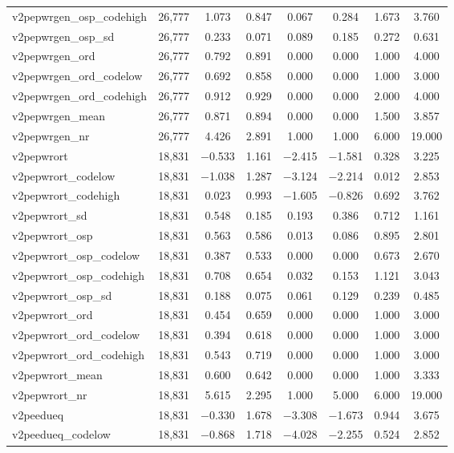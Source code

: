 \begin{table}[!htbp]
\begin{tabular}{@{\extracolsep{5pt}}lccccccc}
v2pepwrgen\_osp\_codehigh & 26,777 & 1.073 & 0.847 & 0.067 & 0.284 & 1.673 & 3.760 \\ 
v2pepwrgen\_osp\_sd & 26,777 & 0.233 & 0.071 & 0.089 & 0.185 & 0.272 & 0.631 \\ 
v2pepwrgen\_ord & 26,777 & 0.792 & 0.891 & 0.000 & 0.000 & 1.000 & 4.000 \\ 
v2pepwrgen\_ord\_codelow & 26,777 & 0.692 & 0.858 & 0.000 & 0.000 & 1.000 & 3.000 \\ 
v2pepwrgen\_ord\_codehigh & 26,777 & 0.912 & 0.929 & 0.000 & 0.000 & 2.000 & 4.000 \\ 
v2pepwrgen\_mean & 26,777 & 0.871 & 0.894 & 0.000 & 0.000 & 1.500 & 3.857 \\ 
v2pepwrgen\_nr & 26,777 & 4.426 & 2.891 & 1.000 & 1.000 & 6.000 & 19.000 \\ 
v2pepwrort & 18,831 & $-$0.533 & 1.161 & $-$2.415 & $-$1.581 & 0.328 & 3.225 \\ 
v2pepwrort\_codelow & 18,831 & $-$1.038 & 1.287 & $-$3.124 & $-$2.214 & 0.012 & 2.853 \\ 
v2pepwrort\_codehigh & 18,831 & 0.023 & 0.993 & $-$1.605 & $-$0.826 & 0.692 & 3.762 \\ 
v2pepwrort\_sd & 18,831 & 0.548 & 0.185 & 0.193 & 0.386 & 0.712 & 1.161 \\ 
v2pepwrort\_osp & 18,831 & 0.563 & 0.586 & 0.013 & 0.086 & 0.895 & 2.801 \\ 
v2pepwrort\_osp\_codelow & 18,831 & 0.387 & 0.533 & 0.000 & 0.000 & 0.673 & 2.670 \\ 
v2pepwrort\_osp\_codehigh & 18,831 & 0.708 & 0.654 & 0.032 & 0.153 & 1.121 & 3.043 \\ 
v2pepwrort\_osp\_sd & 18,831 & 0.188 & 0.075 & 0.061 & 0.129 & 0.239 & 0.485 \\ 
v2pepwrort\_ord & 18,831 & 0.454 & 0.659 & 0.000 & 0.000 & 1.000 & 3.000 \\ 
v2pepwrort\_ord\_codelow & 18,831 & 0.394 & 0.618 & 0.000 & 0.000 & 1.000 & 3.000 \\ 
v2pepwrort\_ord\_codehigh & 18,831 & 0.543 & 0.719 & 0.000 & 0.000 & 1.000 & 3.000 \\ 
v2pepwrort\_mean & 18,831 & 0.600 & 0.642 & 0.000 & 0.000 & 1.000 & 3.333 \\ 
v2pepwrort\_nr & 18,831 & 5.615 & 2.295 & 1.000 & 5.000 & 6.000 & 19.000 \\ 
v2peedueq & 18,831 & $-$0.330 & 1.678 & $-$3.308 & $-$1.673 & 0.944 & 3.675 \\ 
v2peedueq\_codelow & 18,831 & $-$0.868 & 1.718 & $-$4.028 & $-$2.255 & 0.524 & 2.852 \\ 

\end{tabular}
\end{table}
